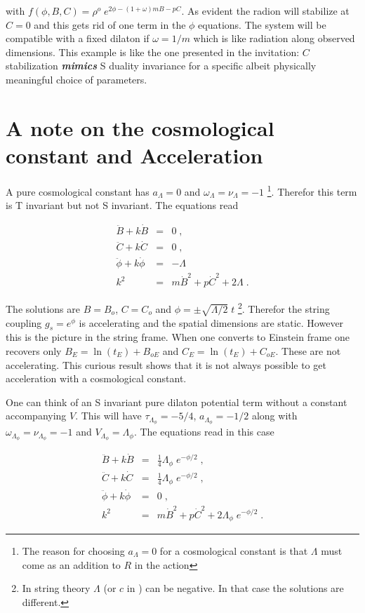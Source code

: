 \documentclass[aps,floatfix,twocolumn,amsmath]{revtex4}
\newcommand{\bea}{\begin{eqnarray}}
\newcommand{\eea}{\end{eqnarray}}
\begin{document}
\noindent with $f(\phi,B,C)=\rho^{o}\;e^{2\phi-(1+\omega)mB-pC}$. As evident the radion will stabilize at $C=0$ and this gets rid of one term in the $\phi$ equations. The system will be compatible with a fixed dilaton if $\omega=1/m$ which is
like radiation along observed dimensions. This example is like the one presented in the invitation: $C$ stabilization {\em{\bf mimics}} S duality invariance for a specific albeit physically meaningful choice of parameters.



\section{A note on the cosmological constant and Acceleration}

A pure cosmological constant has $a_{\Lambda}=0$ and $\omega_{\Lambda}=\nu_{\Lambda}=-1$ \footnote{The reason for choosing $a_{\Lambda}=0$ for a cosmological constant is that $\Lambda$ must come as an addition to $R$ in the action}. Therefor this term is T invariant but  not S invariant. The equations read


\begin{subequations}
\bea
\ddot{B}+k\dot{B}&=& 0 \;,\\
\ddot{C}+k\dot{C}&=& 0 \;,\\
\ddot{\phi}+k\dot{\phi}&=& -\Lambda\\
k^{2}&=&m\dot{B}^{2}+p\dot{C}^{2}+2\Lambda\;.
\eea
\end{subequations}

The solutions are $B=B_{o}$, $C=C_{o}$ and $\phi=\pm\sqrt{\Lambda/2}\;t$ \footnote{In string theory $\Lambda$ (or $c$ in \cite{a1}) can be negative. In that case the solutions are different.}. Therefor the string coupling $g_{s}=e^{\phi}$ is accelerating and the spatial dimensions are static. However this is the picture in the string frame. When one converts to Einstein frame one recovers  only $B_{E}=\ln(t_{E})+B_{oE}$ and $C_{E}=\ln(t_{E})+C_{oE}$. These are not accelerating. This curious result shows that it is not always possible to get acceleration with a cosmological constant.

One can think of an S invariant pure dilaton potential term without a constant accompanying $V$. This will have $\tau_{\Lambda_{\phi}}=-5/4$, $a_{\Lambda_{\phi}}=-1/2$ along with $\omega_{\Lambda_{\phi}}=\nu_{\Lambda_{\phi}}=-1$ and $V_{\Lambda_{\phi}}=\Lambda_{\phi}$. The equations read in this case

\begin{subequations}
\bea
\ddot{B}+k\dot{B}&=& \frac{1}{4}\Lambda_{\phi}\;e^{-\phi/2}\;,\\
\ddot{C}+k\dot{C}&=& \frac{1}{4}\Lambda_{\phi}\;e^{-\phi/2}\;,\\
\ddot{\phi}+k\dot{\phi}&=& 0\;,\\
k^{2}&=&m\dot{B}^{2}+p\dot{C}^{2}+2\Lambda_{\phi}\;e^{-\phi/2}\;. 
\eea
\end{subequations}
\end{document}
